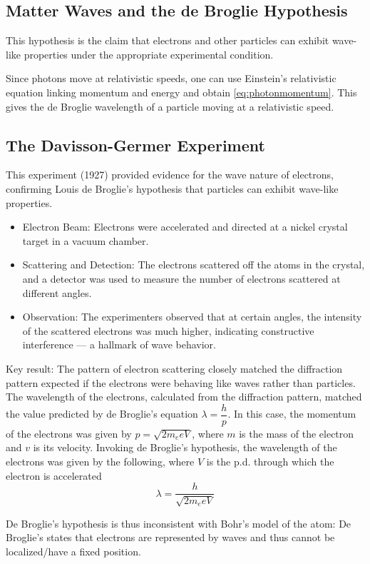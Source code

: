 \documentclass[a4paper,12pt]{article}
\begin{document}
\pagebreak

\subsection{Matter Waves and the de Broglie Hypothesis}

This hypothesis is the claim that electrons and other particles can exhibit wave-like properties under the appropriate experimental condition.

Since photons move at relativistic speeds, one can use Einstein's relativistic equation linking momentum and energy and obtain \cref{eq:photonmomentum}. This gives the de Broglie wavelength of a particle moving at a relativistic speed.

\subsection{The Davisson-Germer Experiment}

This experiment (1927) provided evidence for the wave nature of electrons, confirming Louis de Broglie's hypothesis that particles can exhibit wave-like properties.


\begin{itemize}
  \item Electron Beam: Electrons were accelerated and directed at a nickel crystal target in a vacuum chamber.
  \item Scattering and Detection: The electrons scattered off the atoms in the crystal, and a detector was used to measure the number of electrons scattered at different angles.
  \item Observation: The experimenters observed that at certain angles, the intensity of the scattered electrons was much higher, indicating constructive interference — a hallmark of wave behavior.
\end{itemize}

Key result:
The pattern of electron scattering closely matched the diffraction pattern expected if the electrons were behaving like waves rather than particles. The wavelength of the electrons, calculated from the diffraction pattern, matched the value predicted by de Broglie's equation $\lambda = \dfrac{h}{p}$.
In this case, the momentum of the electrons was given by $p = \sqrt{2m_eeV}$, where $m$ is the mass of the electron and $v$ is its velocity. Invoking de Broglie's hypothesis, the wavelength of the electrons was given by the following, where $V$ is the p.d. through which the electron is accelerated \begin{equation}\label{eq:davisson}
  \lambda = \dfrac{h}{\sqrt{2m_eeV}}
\end{equation}

De Broglie's hypothesis is thus inconsistent with Bohr's model of the atom: De Broglie's states that electrons are represented by waves and thus cannot be localized/have a fixed position.
\end{document}
